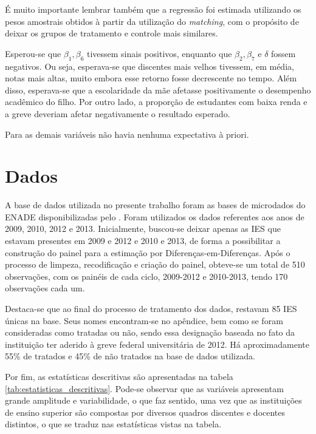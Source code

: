 É muito importante lembrar também que a regressão foi estimada utilizando os pesos amostrais obtidos à partir da utilização do \textit{matching}, com o propósito de deixar os grupos de tratamento e controle mais similares.

Esperou-se que $\beta_1, \beta_6$ tivessem sinais positivos, enquanto que $\beta_2, \beta_7$ e $\delta$ fossem negativos. Ou seja, esperava-se que discentes mais velhos tivessem, em média, notas mais altas, muito embora esse retorno fosse decrescente no tempo. Além disso, esperava-se que a escolaridade da mãe afetasse positivamente o desempenho acadêmico do filho. Por outro lado, a proporção de estudantes com baixa renda e a greve deveriam afetar negativamente o resultado esperado.

Para as demais variáveis não havia nenhuma expectativa à priori.

\section{Dados}

A base de dados utilizada no presente trabalho foram as bases de microdados do ENADE disponibilizadas pelo . Foram utilizados os dados referentes aos anos de 2009, 2010, 2012 e 2013. Inicialmente, buscou-se deixar apenas as IES que estavam presentes em 2009 e 2012 e 2010 e 2013, de forma a possibilitar a construção do painel para a estimação por Diferenças-em-Diferenças. Após o processo de limpeza, recodificação e criação do painel, obteve-se um total de 510 observações, com os painéis de cada ciclo, 2009-2012 e 2010-2013, tendo 170 observações cada um.

Destaca-se que ao final do processo de tratamento dos dados, restavam 85 IES únicas na base. Seus nomes encontram-se no apêndice, bem como se foram consideradas como tratadas ou não, sendo essa designação baseada no fato da instituição ter aderido à greve federal universitária de 2012. Há aproximadamente 55\% de tratados e 45\% de não tratados na base de dados utilizada.

Por fim, as estatísticas descritivas são apresentadas na tabela \ref{tab:estatisticas_descritivas}. Pode-se observar que as variáveis apresentam grande amplitude e variabilidade, o que faz sentido, uma vez que as instituições de ensino superior são compostas por diversos quadros discentes e docentes distintos, o que se traduz nas estatísticas vistas na tabela.


